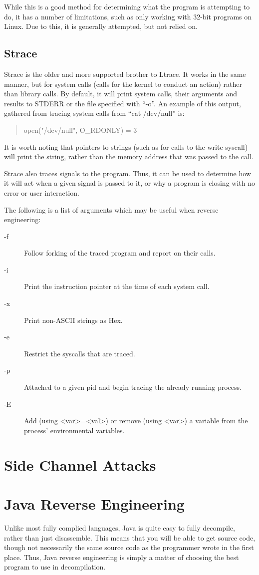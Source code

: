 			While this is a good method for determining what the program is attempting to do, it has a number of limitations, such as only working with 32-bit programs on Linux.
			Due to this, it is generally attempted, but not relied on.
		\subsection{Strace}
			Strace is the older and more supported brother to Ltrace.
			It works in the same manner, but for system calls (calls for the kernel to conduct an action) rather than library calls.
			By default, it will print system calls, their arguments and results to STDERR or the file specified with ``-o''.
			An example of this output, gathered from tracing system calls from ``cat /dev/null'' is:
			\begin{quote}
				open("/dev/null", O\_RDONLY) = 3
			\end{quote}
			It is worth noting that pointers to strings (such as for calls to the write syscall) will print the string, rather than the memory address that was passed to the call.

			Strace also traces signals to the program.
			Thus, it can be used to determine how it will act when a given signal is passed to it, or why a program is closing with no error or user interaction.

			The following is a list of arguments which may be useful when reverse engineering:
			\begin{description}
				\item[-f] Follow forking of the traced program and report on their calls.
				\item[-i] Print the instruction pointer at the time of each system call.
				\item[-x] Print non-ASCII strings as Hex.
				\item[-e] Restrict the syscalls that are traced.
				\item[-p] Attached to a given pid and begin tracing the already running process.
				\item[-E] Add (using <var>=<val>) or remove (using <var>) a variable from the process' environmental variables.
			\end{description}
	\section{Side Channel Attacks}
	\section{Java Reverse Engineering}
		Unlike most fully complied languages, Java is quite easy to fully decompile, rather than just disassemble.
		This means that you will be able to get source code, though not necessarily the same source code as the programmer wrote in the first place.
		Thus, Java reverse engineering is simply a matter of choosing the best program to use in decompilation.

